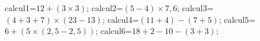 \documentclass[exercice]{thedocument}%
\begin{document}
%
    \>calcul1=$12+(3\times 3)$;%
    \>calcul2=$(5-4)\times7,6$;%
    \>calcul3=$(4+3+7)\times(23-13)$;%
    \>calcul4=$(11+4)-(7+5)$;%
    \>calcul5=$6+(5\times (2,5-2,5))$;%
    \>calcul6=$18+2-10-(3+3)$;%
\end{document}
